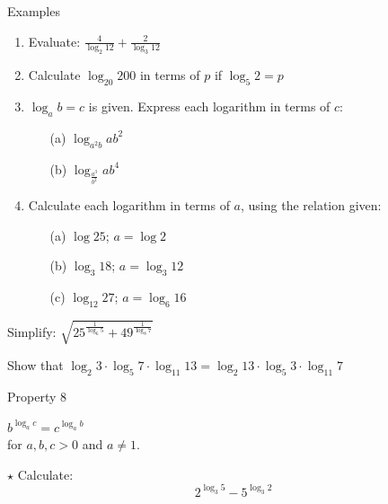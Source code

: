 \documentclass[xcolor=dvipsnames]{beamer}
\begin{document}
\begin{frame}{Examples}
\begin{exampleblock}

\begin{enumerate}
    \item Evaluate:
    $ \frac{4}{\log_{2}12} + \frac{2}{\log_{3}12}  $
   \item Calculate $\log_{20}200 $ in terms of $p$ if $\log_{5}2 = p$
   \item $\log_{a}b = c$ is given. Express each logarithm in terms of $c$:
   \begin{enumerate}
       \item [(a)] $\log_{a^{2}b}ab^{2} $
       \item [(b)] $\log_{\frac{a^{3}}{b^{2}}}ab^{4}$
   \end{enumerate}
   \item Calculate each logarithm in terms of $a$, using the relation given:
   \begin{enumerate}
       \item [(a)] $\log 25 $; $a = \log 2$
       \item [(b)] $\log_{3}18$; $a = \log_{3}12$
       \item [(c)] $\log_{12}27$; $a = \log_{6}16$
   \end{enumerate}
   
\end{enumerate}
\item Simplify: $\sqrt{25^{\frac{1}{\log_{6}5}} + 49^{\frac{1}{\log_{8}7}} }$
\item Show that $\log_{2}3 \cdot \log_{5}7 \cdot \log_{11}13= \log_{2}13 \cdot \log_{5}3 \cdot \log_{11}7$
   \end{exampleblock}
\end{frame}

\begin{frame}{ } 
    \begin{block}{  Property 8   }
 
$b^{ \log_{a}c}  = c^{ \log_{a}b}  $ \\ for $a,b,c >0$ and $a\ne 1.$

   
 \end{block}
 \begin{exampleblock}{$\star$}
 Calculate:
 $$2^{ \log_{3}5} - 5^{ \log_{3}2}  $$
 \end{exampleblock} 
\end{frame}
\end{document}
